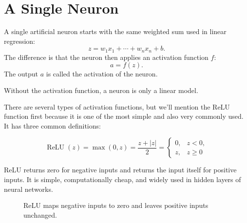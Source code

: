 \documentclass[11pt,openany,oneside]{book}
\begin{document}
\section{A Single Neuron}

A single artificial neuron starts with the same weighted sum used in linear
regression:
\[
    z = w_1x_1 + \cdots + w_nx_n + b.
\]
The difference is that the neuron then applies an activation function $f$:
\[
    a = f(z).
\]
The output $a$ is called the activation of the neuron.

Without the activation function, a neuron is only a linear model. 

There are several types of activation functions, but we'll mention the ReLU function first because it is one of the most simple and also very commonly used. It has three common definitions:



\[
    \operatorname{ReLU}(z) = \max(0,z)
    = \frac{z+|z|}{2}
    =
    \begin{cases}
    0, & z < 0,\\
    z, & z \geq 0
    \end{cases}
\]

ReLU returns zero for negative inputs and returns the input itself for positive
inputs. It is simple, computationally cheap, and widely used in hidden layers of
neural networks.

\begin{figure}[h]
\centering
{}
\caption{ReLU maps negative inputs to zero and leaves positive inputs unchanged.}
\end{figure}
\end{document}
